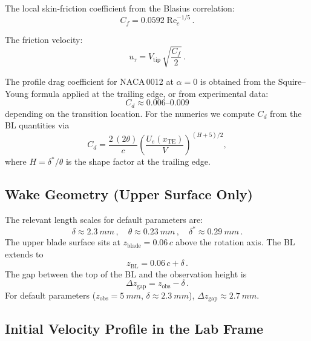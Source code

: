 \documentclass[11pt,a4paper]{article}
\begin{document}
The local skin-friction coefficient from the Blasius correlation:
\begin{equation}
  C_f = 0.0592\;\mathrm{Re}_c^{-1/5}\,.
  \label{eq:Cf}
\end{equation}

The friction velocity:
\begin{equation}
  u_\tau = V_\mathrm{tip}\,\sqrt{\frac{C_f}{2}}\,.
  \label{eq:utau}
\end{equation}

The profile drag coefficient for NACA\,0012 at $\alpha = 0$ is obtained
from the Squire--Young formula applied at the trailing edge, or from
experimental data:
\begin{equation}
  C_d \approx 0.006\text{--}0.009
  \label{eq:Cd}
\end{equation}
depending on the transition location. For the numerics we compute $C_d$
from the BL quantities via
\begin{equation}
  C_d = \frac{2\,(2\theta)}{c}
      \left(\frac{U_e(x_\mathrm{TE})}{V}\right)^{(H+5)/2},
  \label{eq:SY}
\end{equation}
where $H = \delta^*/\theta$ is the shape factor at the trailing edge.

\subsection{Wake Geometry (Upper Surface Only)}

The relevant length scales for default parameters are:
\begin{equation}
  \delta \approx \SI{2.3}{mm}\,,
  \quad
  \theta \approx \SI{0.23}{mm}\,,
  \quad
  \delta^* \approx \SI{0.29}{mm}\,.
\end{equation}
The upper blade surface sits at $z_\mathrm{blade} = 0.06\,c$ above the
rotation axis. The BL extends to
\begin{equation}
  z_\mathrm{BL} = 0.06\,c + \delta\,.
\end{equation}
The gap between the top of the BL and the observation height is
\begin{equation}
  \Delta z_\mathrm{gap} = z_\mathrm{obs} - \delta\,.
  \label{eq:gap}
\end{equation}
For default parameters ($z_\mathrm{obs} = \SI{5}{mm}$,
$\delta \approx \SI{2.3}{mm}$), $\Delta z_\mathrm{gap} \approx \SI{2.7}{mm}$.


\subsection{Initial Velocity Profile in the Lab Frame}
\end{document}
